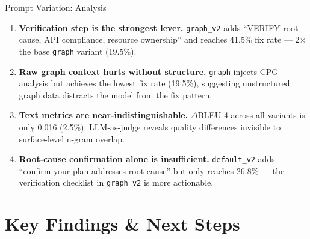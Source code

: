 \documentclass[aspectratio=169,10pt]{beamer}
\begin{document}
\begin{frame}{Prompt Variation: Analysis}
  \begin{enumerate}\setlength{\itemsep}{0.3em}

    \item[\textcolor{hit}{\faIcon{check-circle}}]
      \textbf{Verification step is the strongest lever.}
      \texttt{graph\_v2} adds ``VERIFY root cause, API compliance,
      resource ownership'' and reaches 41.5\% fix rate ---
      2$\times$ the base \texttt{graph} variant (19.5\%).

    \item[\textcolor{miss}{\faIcon{times-circle}}]
      \textbf{Raw graph context hurts without structure.}
      \texttt{graph} injects CPG analysis but achieves the lowest
      fix rate (19.5\%), suggesting unstructured graph data
      distracts the model from the fix pattern.

    \item[\textcolor{c3}{\faIcon{chart-bar}}]
      \textbf{Text metrics are near-indistinguishable.}
      $\Delta$BLEU-4 across all variants is only 0.016 (2.5\%).
      LLM-as-judge reveals quality differences invisible
      to surface-level n-gram overlap.

    \item[\textcolor{c5}{\faIcon{lightbulb}}]
      \textbf{Root-cause confirmation alone is insufficient.}
      \texttt{default\_v2} adds ``confirm your plan addresses
      root cause'' but only reaches 26.8\% --- the verification
      checklist in \texttt{graph\_v2} is more actionable.

  \end{enumerate}
\end{frame}


\section{Key Findings \& Next Steps}
\end{document}
